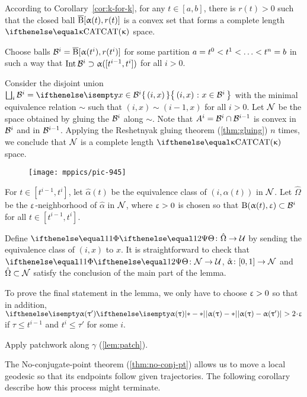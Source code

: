According to Corollary~\ref{cor:k-for-k},
for any $t\in[a,b]$, there is $r(t)>0$ 
such that the closed ball
$\overline{\mathrm{B}}{}[\upalpha(t),r(t)]$ is a  convex set  that forms a complete length $\CAT\kappa$ space.

Choose balls $\mathcal{B}^i=\overline{\mathrm{B}}{}[\upalpha(t^i),r(t^i)]$
for some partition $a\z=t^0<t^1\z<\z\dots\z<t^n\z=b$
in such a way that 
$\Int\spc{B}^i\supset \alpha([t^{i-1},t^i])$ for all $i>0$.

Consider the disjoint union $\bigsqcup_i\spc{B}^i=\set{(i,x)}{x\in\spc{B}^i}$ with the minimal equivalence relation $\sim$ such that $(i,x)\sim(i-1,x)$ for all $i>0$.
Let  $\mathcal{N}$ be the space obtained by gluing the $\mathcal{B}^i$ along $\sim$.
Note that $A^i=\spc{B}^i\cap\spc{B}^{i-1}$ is convex in $\mathcal{B}^i$ and in $\mathcal{B}^{i-1}$.
Applying the Reshetnyak gluing theorem (\ref{thm:gluing}) $n$ times, 
we conclude that $\mathcal{N}$ is a complete length $\CAT\kappa$ space.

\begin{figure}[!ht]
\vskip-0mm
\centering
\texttt{[image: mppics/pic-945]}
\end{figure}

For $t\in[t^{i-1},t^i]$, let $\hat\alpha(t)$  be the equivalence class of $(i,\alpha(t))$ in $\mathcal{N}$.
Let $\hat\Omega$ be the $\upvarepsilon$-neighborhood of $\hat\alpha$ in $\mathcal{N}$, where $\upvarepsilon>0$ is chosen so that $\oBall(\alpha(t),\eps)\subset\spc{B}^i$ for all $t\in[t^{i-1},t^i]$.

Define $\map\:\hat\Omega\to\spc{U}$
by sending the equivalence class of $(i,x)$ to $x$.
It is straightforward to check that $\map\:\spc{N}\to\spc{U}$, $\hat\alpha\:[0,1]\to\spc{N}$ and $\hat\Omega\subset\spc{N}$ satisfy the conclusion of the main part of the lemma.

To prove the final statement in the lemma,
we only have to choose $\upvarepsilon>0$ so that in addition, $\dist{\alpha(\tau)}{\alpha(\tau')}{}>2\cdot\eps$ if $\tau\le t^{i-1}$ and $t^i\le\tau'$ for some $i$.
\qeds


Apply patchwork along $\gamma$ (\ref{lem:patch}). 
\qeds



The No-conjugate-point theorem (\ref{thm:no-conj-pt}) allows us to move a local geodesic  
so that its endpoints follow given trajectories.
The following corollary describe how this process might terminate. 


